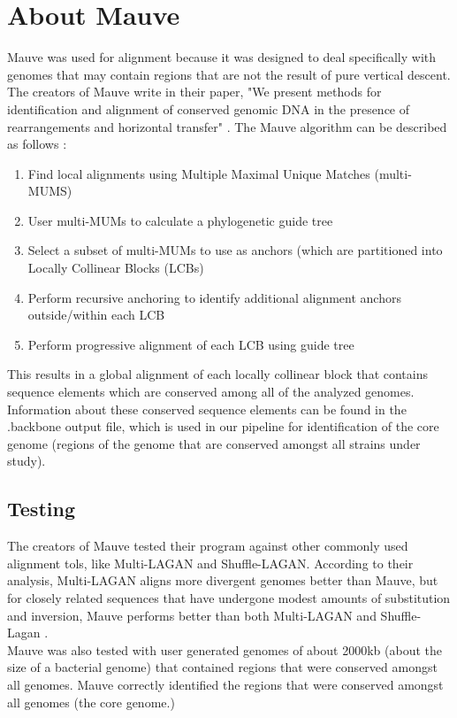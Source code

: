 \documentclass[12pt]{article}
\newcommand{\tab}{\hspace*{3em}}
\begin{document}
\section{About Mauve}
\tab Mauve was used for alignment because it was designed to deal specifically with genomes that may contain regions that are not the result of pure vertical descent. The creators of Mauve write in their paper, "We present methods for identification and alignment of conserved genomic DNA in the presence of rearrangements and horizontal transfer" \cite{mauve}. The Mauve algorithm can be described as follows \cite{mauve}:\\
\begin{enumerate}
\item Find local alignments using Multiple Maximal Unique Matches (multi-MUMS)
\item User multi-MUMs to calculate a phylogenetic guide tree
\item Select a subset of multi-MUMs to use as anchors (which are partitioned into Locally Collinear Blocks (LCBs)
\item Perform recursive anchoring to identify additional alignment anchors outside/within each LCB
\item Perform progressive alignment of each LCB using guide tree
\end{enumerate}
\tab This results in a global alignment of each locally collinear block that contains sequence elements which are conserved among all of the analyzed genomes. Information about these conserved sequence elements can be found in the .backbone output file, which is used in our pipeline for identification of the core genome (regions of the genome that are conserved amongst all strains under study).\\ 

\subsection{Testing}
\tab The creators of Mauve tested their program against other commonly used alignment tols, like Multi-LAGAN and Shuffle-LAGAN. According to their analysis, Multi-LAGAN aligns more divergent genomes better than Mauve, but for closely related sequences that have undergone modest amounts of substitution and inversion, Mauve performs better than both Multi-LAGAN and Shuffle-Lagan \cite{mauve}. \\
\tab Mauve was also tested with user generated genomes of about 2000kb (about the size of a bacterial genome)  that contained regions that were conserved amongst all genomes. Mauve correctly identified the regions that were conserved amongst all genomes (the core genome.)
\end{document}
